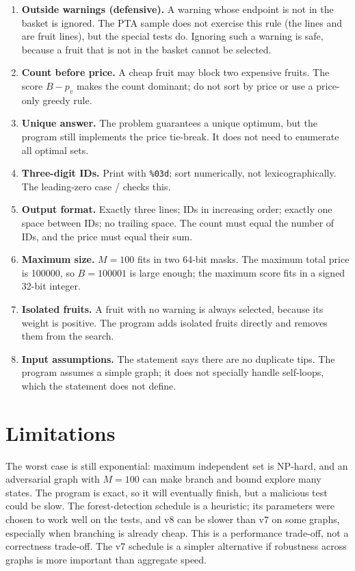 \documentclass[12pt,a4paper]{report}
\newcommand{\code}[1]{\texttt{\detokenize{#1}}}
\begin{document}
\begin{enumerate}
\item \textbf{Outside warnings (defensive).}  A warning whose endpoint is not
      in the basket is ignored.  The PTA sample does not exercise this rule
      (the lines \code{020 99} and \code{019 99} are fruit lines), but the
      special tests do.  Ignoring such a warning is safe, because a fruit that
      is not in the basket cannot be selected.
\item \textbf{Count before price.}  A cheap fruit may block two expensive
      fruits.  The score $B-p_v$ makes the count dominant; do not sort by price
      or use a price-only greedy rule.
\item \textbf{Unique answer.}  The problem guarantees a unique optimum, but the
      program still implements the price tie-break.  It does not need to
      enumerate all optimal sets.
\item \textbf{Three-digit IDs.}  Print with \texttt{\%03d}; sort numerically, not
      lexicographically.  The leading-zero case \code{010}/\code{100} checks
      this.
\item \textbf{Output format.}  Exactly three lines; IDs in increasing order;
      exactly one space between IDs; no trailing space.  The count must equal
      the number of IDs, and the price must equal their sum.
\item \textbf{Maximum size.}  $M=100$ fits in two 64-bit masks.  The maximum
      total price is 100000, so $B=100001$ is large enough; the maximum score
      fits in a signed 32-bit integer.
\item \textbf{Isolated fruits.}  A fruit with no warning is always selected,
      because its weight is positive.  The program adds isolated fruits
      directly and removes them from the search.
\item \textbf{Input assumptions.}  The statement says there are no duplicate
      tips.  The program assumes a simple graph; it does not specially handle
      self-loops, which the statement does not define.
\end{enumerate}

\section{Limitations}

The worst case is still exponential: maximum independent set is NP-hard, and an
adversarial graph with $M=100$ can make branch and bound explore many states.
The program is exact, so it will eventually finish, but a malicious test could
be slow.  The forest-detection schedule is a heuristic; its parameters were
chosen to work well on the tests, and v8 can be slower than v7 on some graphs,
especially when branching is already cheap.  This is a performance trade-off,
not a correctness trade-off.  The v7 schedule is a simpler alternative if
robustness across graphs is more important than aggregate speed.
\end{document}
